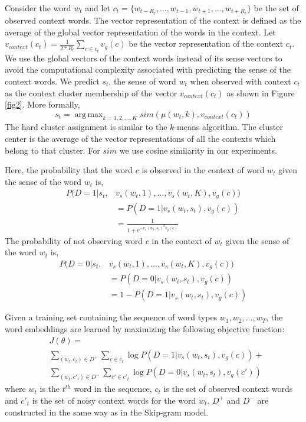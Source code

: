 \documentclass[11pt,a4paper]{article}
\DeclareMathOperator*{\argmax}{arg\,max}
\begin{document}
Consider the word $w_t$ and let $c_t=\{ w_{t-R_{t}}, \ldots, w_{t-1}, w_{t+1}, \ldots, w_{t+R_{t}} \}$ be the set of observed context words. The vector representation of the context is defined as the average of the global vector representation of the words in the context. Let $v_{context}(c_t) = \frac{1}{2*R_{t}} \sum_{c \in c_{t} }v_g(c)$ be the vector representation of the context $c_t$. We use the global vectors of the context words instead of its sense vectors to avoid the computational complexity associated with predicting the sense of the context words. We predict $s_{t}$, the sense of word $w_{t}$ when observed with context $c_{t}$ as the context cluster membership of the vector $v_{context}(c_t)$ as shown in Figure \ref{fig2}. More formally, 
\begin{equation}
s_t = \argmax_{k=1,2,\ldots,K}  sim(\mu(w_t, k), v_{context}(c_t))
\end{equation}
The hard cluster assignment is similar to the $k$-means algorithm. The
cluster center is the average of the vector representations of all the
contexts which belong to that cluster.  For $sim$ we use cosine similarity in our experiments.

Here, the probability that the word $c$ is observed in the context of word $w_t$ given the sense of the word $w_{t}$ is,
\begin{align*}
P(D = 1 | s_t, &v_s(w_t, 1), \ldots, v_s(w_t, K), v_g(c)) \\ &=P(D = 1 | v_s(w_t, s_t), v_g(c)) \\&= \frac{1}{1 + e^{-v_s(w_t, s_{t})^Tv_g(c)} }
\end{align*}
The probability of not observing word $c$ in the context of $w_t$ given the sense of the word $w_{t}$ is, 
\begin{align*}
P(D = 0 | s_t, &v_s(w_t, 1), \ldots, v_s(w_t, K), v_g(c))  \\ &=P(D = 0 | v_s(w_t, s_t), v_g(c))  \\&= 1 - P(D = 1 |v_s(w_t, s_t), v_g(c))
\end{align*}

Given a training set containing the sequence of word types $w_1, w_2, ..., w_T$, the word embeddings are learned by maximizing the following objective function:
\begin{align*}
&J(\theta)= \\ & \sum_{(w_t, c_t) \in D^{+}}{ \sum_{c \in c_{t}}  \log P(D = 1| v_s(w_t, s_t), v_g(c) )  } + \\
      & \sum_{(w_t, c'_t) \in D^{-}}{ \sum_{c' \in c'_{t}}  \log P(D = 0 | v_s(w_t, s_t), v_g(c')) }
\end{align*}
where $w_t$ is the $t^{th}$ word in the sequence, $c_t$ is the set of observed context words and $c'_t$ is the set of noisy context words for the word $w_t$. $D^{+}$ and $D^{-}$ are constructed in the same way as in the Skip-gram model. 
\end{document}
